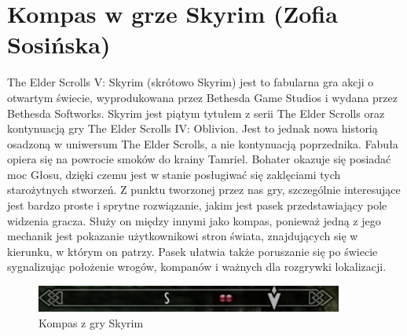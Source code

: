 \section{Kompas w grze Skyrim (Zofia Sosińska)}\label{chap:skrm}

The Elder Scrolls V: Skyrim (skrótowo Skyrim) jest to fabularna gra akcji o otwartym świecie, 
wyprodukowana przez Bethesda Game Studios i wydana przez Bethesda Softworks. Skyrim jest piątym 
tytułem z serii The Elder Scrolls oraz kontynuacją gry The Elder Scrolls IV: Oblivion. Jest to jednak 
nowa historią osadzoną w uniwersum The Elder Scrolls, a nie kontynuacją poprzednika. Fabuła opiera się 
na powrocie smoków do krainy Tamriel. Bohater okazuje się posiadać moc Głosu, dzięki czemu jest w stanie 
posługiwać się zaklęciami tych starożytnych stworzeń.
Z punktu tworzonej przez nas gry, szczególnie interesujące jest  bardzo proste i sprytne rozwiązanie,
jakim jest pasek przedstawiający pole widzenia gracza. Służy on między innymi jako kompas, ponieważ 
jedną z jego mechanik jest pokazanie użytkownikowi stron świata, znajdujących się w kierunku, w którym 
on patrzy. Pasek ułatwia także poruszanie się po świecie sygnalizując położenie wrogów, kompanów i ważnych 
dla rozgrywki lokalizacji.


	\begin{figure}[htbp]
		\centering
		\includegraphics[width=0.9\textwidth]{images/ui/compassSkyrim.png}
		\caption{Kompas z gry Skyrim}\label{fig:Fallout}
	\end{figure}

